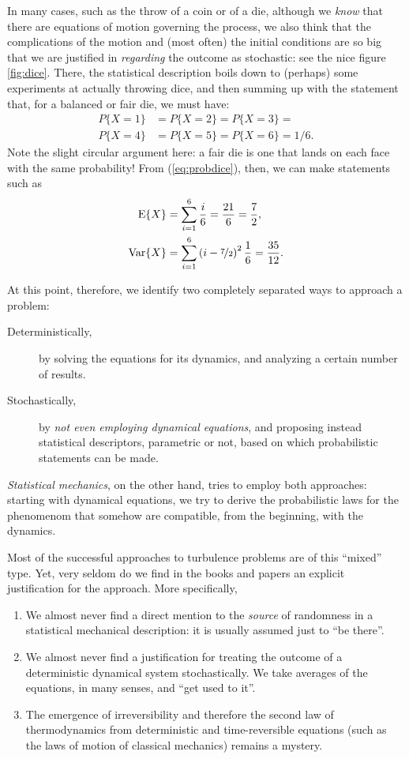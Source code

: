 \documentclass[12pt]{article}
\begin{document}
In many cases, such as the throw of a coin or of a die, although we \emph{know}
that there are equations of motion governing the process, we also think that the
complications of the motion and (most often) the initial conditions are so big
that we are justified in \emph{regarding} the outcome as stochastic: see the
nice figure \ref{fig:dice}.  There, the statistical description boils down to
(perhaps) some experiments at actually throwing dice, and then summing up with
the statement that, for a balanced or fair die, we must have:
\begin{align}
P\{ X = 1\} &=
P\{ X = 2\} =
P\{ X = 3\} =\nonumber \\
P\{ X = 4\} &=
P\{ X = 5\} =
P\{ X = 6\} = 1/6. \label{eq:probdice}
\end{align}
Note the slight circular argument here: a fair die is one that lands on each
face with the same probability!  From (\ref{eq:probdice}), then, we can make
statements such as
\begin{align}
\operatorname{E}\{ X\} &= \sum_{i=1}^6 \frac{i}{6} = \frac{21}{6} = \frac{7}{2}, \\
\operatorname{Var}\{ X\} &= \sum_{i=1}^6 \left( i - \nicefrac{7}{2}\right)^2\frac{1}{6} = \frac{35}{12}.
\end{align}

At this point, therefore, we identify two completely separated ways to approach
a problem:
\begin{description}
\item[Deterministically,] by solving the equations for its dynamics, and
  analyzing a certain number of results.
\item[Stochastically,] by \emph{not even employing dynamical equations}, and
  proposing instead statistical descriptors, parametric or not, based on which
  probabilistic statements can be made.
\end{description}

\emph{Statistical mechanics}, on the other hand, tries to employ both
approaches: starting with dynamical equations, we try to derive the
probabilistic laws for the phenomenom that somehow are compatible, from the
beginning, with the dynamics.

Most of the successful approaches to turbulence problems are of this ``mixed''
type. Yet, very seldom do we find in the books and papers an explicit
justification for the approach. More specifically, 
\begin{enumerate}
\item We almost never find a direct mention to the \emph{source} of randomness
  in  a statistical mechanical description: it is usually assumed just to ``be there''.
\item We almost never find a justification for treating the outcome of a
  deterministic dynamical system stochastically.  We take averages of the
  equations, in many senses, and ``get used to it''.
\item The emergence of irreversibility and therefore the second law of
  thermodynamics from deterministic and time-reversible equations (such as the
  laws of motion of classical mechanics) remains a mystery.
\end{enumerate}
\end{document}
